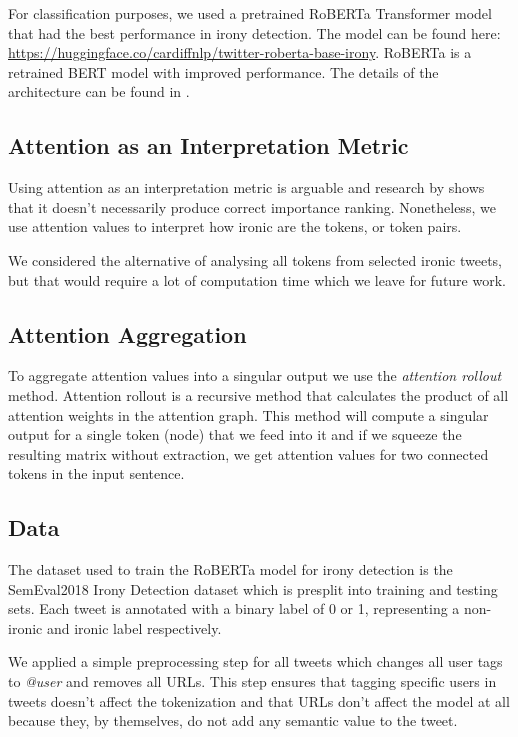 \documentclass[10pt, a4paper]{article}
\begin{document}
For classification purposes, we used a pretrained RoBERTa Transformer model that had the best performance in irony detection.
The model can be found here: \url{https://huggingface.co/cardiffnlp/twitter-roberta-base-irony}.
RoBERTa is a retrained BERT model with improved performance. The details of the architecture can be found in \citep{roberta}. 

\subsection{Attention as an Interpretation Metric}

Using attention as an interpretation metric is arguable and research by \cite{attention-interpretable} shows that it doesn't necessarily produce correct importance ranking.
Nonetheless, we use attention values to interpret how ironic are the tokens, or token pairs.

We considered the alternative of analysing all tokens from selected ironic tweets, but that would require a lot of computation time which we leave for future work.

\subsection{Attention Aggregation}
\label{sec:attaggr}

To aggregate attention values into a singular output we use the \textit{attention rollout} method.
Attention rollout is a recursive method that calculates the product of all attention weights in the attention graph. \citep{quantifying-attention-flow}
This method will compute a singular output for a single token (node) that we feed into it and if we squeeze the resulting matrix without extraction, we get attention values for two connected tokens in the input sentence.

\subsection{Data}

The dataset used to train the RoBERTa model for irony detection is the SemEval2018 Irony Detection dataset \citep{van-hee-etal-2018-semeval} which is presplit into training and testing sets.
Each tweet is annotated with a binary label of 0 or 1, representing a non-ironic and ironic label respectively.

We applied a simple preprocessing step for all tweets which changes all user tags to \textit{@user} and removes all URLs.
This step ensures that tagging specific users in tweets doesn't affect the tokenization and that URLs don't affect the model at all because they, by themselves, do not add any semantic value to the tweet.
\end{document}
